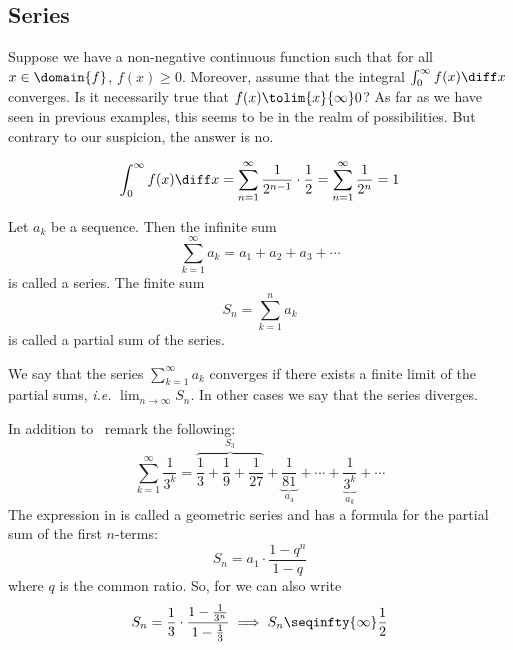 \subsection{Series}\label{subsec-series}

\begin{flushleft}
	Suppose we have a non-negative continuous function such that for all $x\in\domain{f}$,
	$f(x)\geq0$. Moreover, assume that the integral $\int_0^\infty f(x) \diff x$
	converges. Is it necessarily true that $f(x) \tolim{x}{\infty} 0$? As far as
	we have seen in previous examples, this seems to be in the realm of possibilities.
	But contrary to our suspicion, the answer is no.
\end{flushleft}

\begin{equation*}
	\int_0^\infty f(x) \diff x = \sum_{n=1}^\infty \frac{1}{2^{n-1}} \cdot \frac{1}{2} = \sum_{n=1}^\infty \frac{1}{2^n} = 1
\end{equation*}

\begin{definition}\label{def-series-partial-sum}
	Let $a_k$ be a sequence. Then the infinite sum
	\begin{equation}\label{eq-series-definition}
		\sum_{k=1}^\infty a_k = a_1 + a_2 + a_3 + \cdots
	\end{equation}
	is called a series. The finite sum
	\begin{equation}\label{eq-partial-sum-definition}
		S_n = \sum_{k=1}^n a_k
	\end{equation}
	is called a partial sum of the series.
\end{definition}

\begin{definition}\label{def-series-converges-diverges}
	We say that the series $\sum_{k=1}^\infty a_k$ converges if there exists a
	finite limit of the partial sums, \textit{i.e.} $\lim_{n\to\infty}S_n$. In
	other cases we say that the series diverges.
\end{definition}

\begin{exm}\label{exm-sequence-series:1}
	In addition to \, remark the following:
	\begin{equation}\label{eq-exm-geometric-sequence}
		\sum_{k=1}^\infty \frac{1}{3^k} = \overbrace{\frac{1}{3} + \frac{1}{9} + \frac{1}{27}}^{S_3} + \underbrace{\frac{1}{81}}_{a_4} + \cdots + \underbrace{\frac{1}{3^k}}_{a_k} + \cdots
	\end{equation}
	The expression in  is called a geometric series
	and has a formula for the partial sum of the first $n$-terms:
	\begin{equation}
		S_n = a_1\cdot\frac{1-q^n}{1-q}
	\end{equation}
	where $q$ is the common ratio. So, for 
	we can also write
	\begin{equation*}
		S_n = \frac{1}{3}\cdot\frac{1-\frac{1}{3^n}}{1-\frac{1}{3}} \implies S_n \seqinfty{\infty} \frac{1}{2}
	\end{equation*}
\end{exm}

